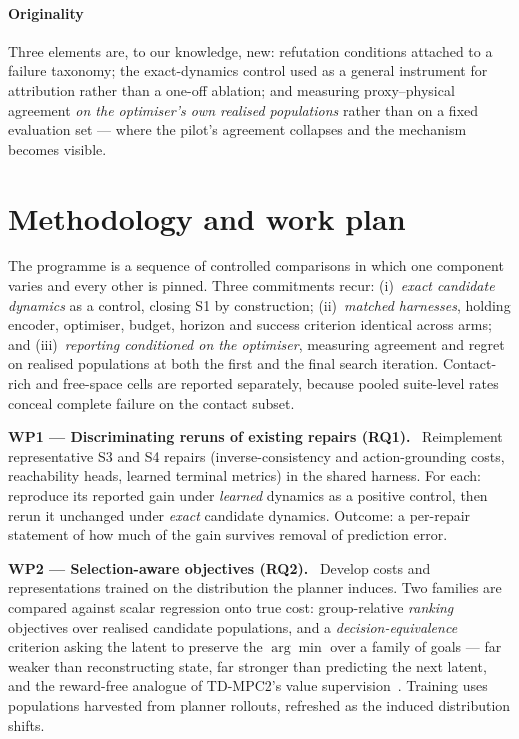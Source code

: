 \documentclass[11pt,letterpaper]{article}
\begin{document}
\paragraph{Originality} Three elements are, to our knowledge, new: refutation
conditions attached to a failure taxonomy; the exact-dynamics control used as a
general instrument for attribution rather than a one-off ablation; and measuring
proxy--physical agreement \emph{on the optimiser's own realised populations}
rather than on a fixed evaluation set --- where the pilot's agreement collapses
and the mechanism becomes visible.

\section{Methodology and work plan}

The programme is a sequence of controlled comparisons in which one component
varies and every other is pinned. Three commitments recur: (i)~\emph{exact
candidate dynamics} as a control, closing S1 by construction; (ii)~\emph{matched
harnesses}, holding encoder, optimiser, budget, horizon and success criterion
identical across arms; and (iii)~\emph{reporting conditioned on the optimiser},
measuring agreement and regret on realised populations at both the first and the
final search iteration. Contact-rich and free-space cells are reported
separately, because pooled suite-level rates conceal complete failure on the
contact subset.

\vspace{2pt}\noindent\textbf{WP1 --- Discriminating reruns of existing repairs (RQ1).}~ Reimplement representative S3 and S4 repairs (inverse-consistency and
action-grounding costs, reachability heads, learned terminal metrics) in the
shared harness. For each: reproduce its reported gain under \emph{learned}
dynamics as a positive control, then rerun it unchanged under \emph{exact}
candidate dynamics. Outcome: a per-repair statement of how much of the gain
survives removal of prediction error.

\vspace{2pt}\noindent\textbf{WP2 --- Selection-aware objectives (RQ2).}~ Develop costs and representations trained on the distribution the planner
induces. Two families are compared against scalar regression onto true cost:
group-relative \emph{ranking} objectives over realised candidate populations,
and a \emph{decision-equivalence} criterion asking the latent to preserve the
$\arg\min$ over a family of goals --- far weaker than reconstructing state, far
stronger than predicting the next latent, and the reward-free analogue of
TD-MPC2's value supervision~\citep{hansen2024tdmpc2}. Training uses populations
harvested from planner rollouts, refreshed as the induced distribution shifts.
\end{document}
